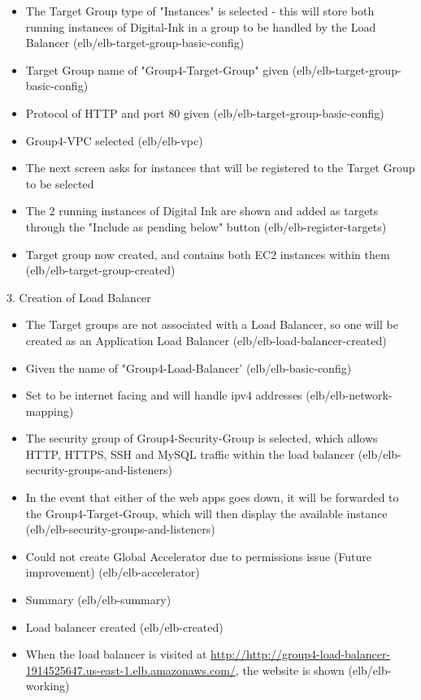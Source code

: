 \begin{itemize}
    \item The Target Group type of "Instances" is selected - this will store both running instances of Digital-Ink in a group
    to be handled by the Load Balancer (elb/elb-target-group-basic-config)
    \item Target Group name of "Group4-Target-Group" given (elb/elb-target-group-basic-config)
    \item Protocol of HTTP and port 80 given (elb/elb-target-group-basic-config)
    \item Group4-VPC selected (elb/elb-vpc)
    \item The next screen asks for instances that will be registered to the Target Group to be selected
    \item The 2 running instances of Digital Ink are shown and added as targets through the "Include as pending below"
    button (elb/elb-register-targets)
    \item Target group now created, and contains both EC2 instances within them (elb/elb-target-group-created)
\end{itemize}

3. Creation of Load Balancer

\begin{itemize}
    \item The Target groups are not associated with a Load Balancer, so one will be created as an Application Load Balancer
    (elb/elb-load-balancer-created)
    \item Given the name of "Group4-Load-Balancer' (elb/elb-basic-config)
    \item Set to be internet facing and will handle ipv4 addresses (elb/elb-network-mapping)
    \item The security group of Group4-Security-Group is selected, which allows HTTP, HTTPS, SSH and MySQL traffic within
    the load balancer (elb/elb-security-groups-and-listeners)
    \item In the event that either of the web apps goes down, it will be forwarded to the Group4-Target-Group, which will then
    display the available instance (elb/elb-security-groups-and-listeners)
    \item Could not create Global Accelerator due to permissions issue (Future improvement) (elb/elb-accelerator)
    \item Summary (elb/elb-summary)
    \item Load balancer created (elb/elb-created)
    \item When the load balancer is visited at
    \href{http://http://group4-load-balancer-1914525647.us-east-1.elb.amazonaws.com/}{http://http://group4-load-balancer-1914525647.us-east-1.elb.amazonaws.com/},
    the website is shown (elb/elb-working)
\end{itemize}